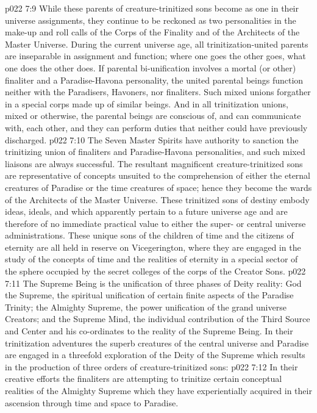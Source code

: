 \vs p022 7:9 While these parents of creature\hyp{}trinitized sons become as one in their universe assignments, they continue to be reckoned as two personalities in the make\hyp{}up and roll calls of the Corps of the Finality and of the Architects of the Master Universe. During the current universe age, all trinitization\hyp{}united parents are inseparable in assignment and function; where one goes the other goes, what one does the other does. If parental bi\hyp{}unification involves a mortal (or other) finaliter and a Paradise\hyp{}Havona personality, the united parental beings function neither with the Paradisers, Havoners, nor finaliters. Such mixed unions forgather in a special corps made up of similar beings. And in all trinitization unions, mixed or otherwise, the parental beings are conscious of, and can communicate with, each other, and they can perform duties that neither could have previously discharged.
\vs p022 7:10 \pc The Seven Master Spirits have authority to sanction the trinitizing union of finaliters and Paradise\hyp{}Havona personalities, and such mixed liaisons are always successful. The resultant magnificent creature\hyp{}trinitized sons are representative of concepts unsuited to the comprehension of either the eternal creatures of Paradise or the time creatures of space; hence they become the wards of the Architects of the Master Universe. These trinitized sons of destiny embody ideas, ideals, and  which apparently pertain to a future universe age and are therefore of no immediate practical value to either the super\hyp{} or central universe administrations. These unique sons of the children of time and the citizens of eternity are all held in reserve on Vicegerington, where they are engaged in the study of the concepts of time and the realities of eternity in a special sector of the sphere occupied by the secret colleges of the corps of the Creator Sons.
\vs p022 7:11 \pc The Supreme Being is the unification of three phases of Deity reality: God the Supreme, the spiritual unification of certain finite aspects of the Paradise Trinity; the Almighty Supreme, the power unification of the grand universe Creators; and the Supreme Mind, the individual contribution of the Third Source and Center and his co\hyp{}ordinates to the reality of the Supreme Being. In their trinitization adventures the superb creatures of the central universe and Paradise are engaged in a threefold exploration of the Deity of the Supreme which results in the production of three orders of creature\hyp{}trinitized sons:
\vs p022 7:12 \bibnobreakspace {} In their creative efforts the finaliters are attempting to trinitize certain conceptual realities of the Almighty Supreme which they have experientially acquired in their ascension through time and space to Paradise.
